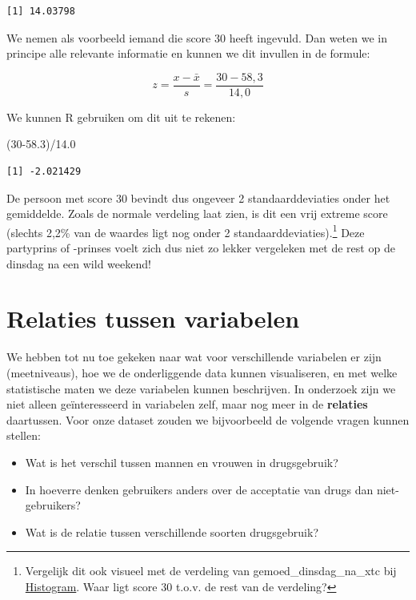 \documentclass[
  letterpaper,
  DIV=11,
  numbers=noendperiod]{scrreprt}
\newenvironment{Shaded}{\begin{snugshade}}{\end{snugshade}}
\newcommand{\DecValTok}[1]{\textcolor[rgb]{0.68,0.00,0.00}{#1}}
\newcommand{\FloatTok}[1]{\textcolor[rgb]{0.68,0.00,0.00}{#1}}
\newcommand{\NormalTok}[1]{\textcolor[rgb]{0.00,0.23,0.31}{#1}}
\newcommand{\SpecialCharTok}[1]{\textcolor[rgb]{0.37,0.37,0.37}{#1}}
\providecommand{\tightlist}{%
  \setlength{\itemsep}{0pt}\setlength{\parskip}{0pt}}
\begin{document}
\begin{verbatim}
[1] 14.03798
\end{verbatim}

We nemen als voorbeeld iemand die score 30 heeft ingevuld. Dan weten we
in principe alle relevante informatie en kunnen we dit invullen in de
formule:

\[ z=\frac{x-\bar{x}}{s}=\frac{30-58,3}{14,0} \]

We kunnen R gebruiken om dit uit te rekenen:

\begin{Shaded}
\begin{Highlighting}[]
\NormalTok{(}\DecValTok{30}\FloatTok{{-}58.3}\NormalTok{)}\SpecialCharTok{/}\FloatTok{14.0}
\end{Highlighting}
\end{Shaded}

\begin{verbatim}
[1] -2.021429
\end{verbatim}

De persoon met score 30 bevindt dus ongeveer 2 standaarddeviaties onder
het gemiddelde. Zoals de normale verdeling laat zien, is dit een vrij
extreme score (slechts 2,2\% van de waardes ligt nog onder 2
standaarddeviaties).\footnote{Vergelijk dit ook visueel met de verdeling
  van gemoed\_dinsdag\_na\_xtc bij \hyperref[sec-histogram]{Histogram}.
  Waar ligt score 30 t.o.v. de rest van de verdeling?} Deze partyprins
of -prinses voelt zich dus niet zo lekker vergeleken met de rest op de
dinsdag na een wild weekend!

\chapter{Relaties tussen variabelen}\label{relaties-tussen-variabelen}

We hebben tot nu toe gekeken naar wat voor verschillende variabelen er
zijn (meetniveaus), hoe we de onderliggende data kunnen visualiseren, en
met welke statistische maten we deze variabelen kunnen beschrijven. In
onderzoek zijn we niet alleen geïnteresseerd in variabelen zelf, maar
nog meer in de \textbf{relaties} daartussen. Voor onze dataset zouden we
bijvoorbeeld de volgende vragen kunnen stellen:

\begin{itemize}
\tightlist
\item
  Wat is het verschil tussen mannen en vrouwen in drugsgebruik?
\item
  In hoeverre denken gebruikers anders over de acceptatie van drugs dan
  niet-gebruikers?
\item
  Wat is de relatie tussen verschillende soorten drugsgebruik?
\end{itemize}
\end{document}
